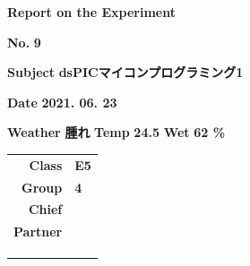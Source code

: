 \documentclass[9pt,a4paper,]{ltjsarticle}
\begin{document}




\newenvironment{boldtabular}{ \arrayrulewidth = 2pt }{}
\newenvironment{narrowtabular}{ \renewcommand{\arraystretch}{0.8} }{}
\newenvironment{titletabular}{ \renewcommand{\arraystretch}{1.1} }{}
\newenvironment{datetabular}{ \renewcommand{\arraystretch}{1.1} }{}
\newenvironment{templaturetabular}{ \renewcommand{\arraystretch}{1.18} }{}
\newenvironment{report-title}{
\centering
  \fontsize{20pt}{20pt}\selectfont
}{}
\fontsize{14pt}{28pt}\selectfont

\begin{center}
  \begin{report-title}
    \textbf{Report on the Experiment}
  \end{report-title}

  \vspace{10mm}

  \textbf{No.} \textbf{9}\\

  \vspace{10mm}

  \textbf{Subject} \textbf{dsPICマイコンプログラミング1}\\

  \vspace{10mm}

  \textbf{Date} \textbf{2021. 06. 23}\\

  \vspace{10mm}

  \textbf{Weather} \textbf{    腫れ    }
  \textbf{Temp} \textbf{    24.5 \celsius    }
  \textbf{Wet} \textbf{    62 \%    }
\end{center}

\vspace{10mm}

\begin{table}[!h]
  \begin{flushright}
    \begin{tabular}{rl}
      \textbf{Class}   & \textbf{ E5 } \\
      \textbf{Group}   & \textbf{ 4 } \\
      \textbf{Chief}   & \textbf{  } \\
      \textbf{Partner} & \textbf{  } \\
                       & \textbf{  } \\
                       & \textbf{  } \\
                       & \textbf{  }
    \end{tabular}
  \end{flushright}
\end{table}
\end{document}
